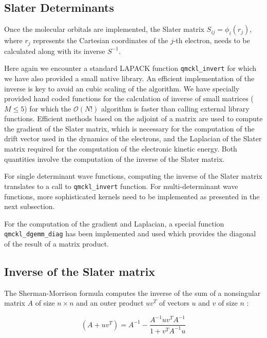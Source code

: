 \subsection{Slater Determinants}

Once the molecular orbitals are implemented, the Slater matrix $S_{ij} = \phi_i(r_j)$,
where $r_j$ represents the Cartesian coordinates of the $j$-th electron, needs to be
calculated along with its inverse $S^{-1}$.
  
Here again we encounter a standard \ac{LAPACK} function
\texttt{qmckl_invert} for which we have also provided a small native
library. An efficient implementation of the inverse is key to avoid an cubic
scaling of the algorithm. We have specially provided hand coded functions for
the calculation of inverse of small matrices ($M\le 5$) for which the
$\mathcal{O}(N!)$ algorithm is faster than calling external library functions.
Efficient methods based on the adjoint of a matrix \cite{MCMQC} are used to
compute the gradient of the Slater matrix, which is necessary for the 
computation of the drift vector used in the dynamics of the
electrons, and the Laplacian of the Slater matrix required for the computation of
the electronic kinetic energy. Both quantities involve the computation of
the inverse of the Slater matrix.

For single determinant wave functions, computing the inverse of the Slater
matrix translates to a call to \texttt{qmckl_invert} function. For
multi-determinant wave functions, more sophisticated kernels need to be
implemented as presented in the next subsection.

For the computation of the gradient and Laplacian, a special function
\texttt{qmckl_dgemm_diag} has been implemented and used which provides
the diagonal of the result of a matrix product. 

\subsection{Inverse of the Slater matrix}

The Sherman-Morrison formula computes the inverse of the sum of a
nonsingular matrix $A$ of size $n \times n$ and an outer product
$uv^T$ of vectors $u$ and $v$ of size $n$ :

\begin{equation}
    (A + uv^T) = A^{-1} - \frac{A^{-1} uv^T A^{-1}}{1 + v^T A^{-1} u}
    \label{eq:sherman}
\end{equation}


